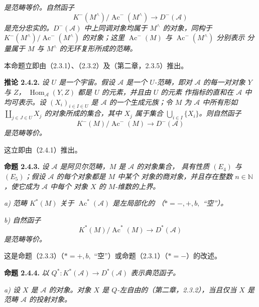 \clearpage
{}%
\begingroup\small\setlength{\parskip}{0pt}\setlength{\emergencystretch}{1.5em}
\setlength{\abovedisplayskip}{4pt plus 2pt minus 2pt}%
\setlength{\belowdisplayskip}{4pt plus 2pt minus 2pt}%

\noindent\textit{是范畴等价。自然函子}
\[
K^{-}(M^{\wedge})/\operatorname{Ac}^{-}(M^{\wedge})
\longrightarrow D^{-}(\mathcal A)
\]
\noindent\textit{是充分忠实的。$D^{-}(\mathcal A)$ 中上同调对象均属于
$M^{\wedge}$ 的对象，同构于
$K^{-}(M^{\wedge})/\operatorname{Ac}^{-}(M^{\wedge})$ 的对象；这里
$\operatorname{Ac}^{-}(M)$ 与 $\operatorname{Ac}^{-}(M^{\wedge})$ 分别表示
分量属于 $M$ 与 $M^{\wedge}$ 的无环复形所成的范畴。}

本命题立即由（2.3.1）、（2.3.2）及（第二章，2.3.5）推出。

\medskip\noindent\textbf{推论 2.4.2.}\quad
\textit{设 $U$ 是一个宇宙。假设 $\mathcal A$ 是一个 $U$-范畴，即对
$\mathcal A$ 的每一对对象 $Y$ 与 $Z$，
$\operatorname{Hom}_{\mathcal A}(Y,Z)$ 都是 $U$ 的元素，并且由 $U$ 的元素
作指标的直和在 $\mathcal A$ 中均可表示。设 $(X_i)_{i\in I\in U}$ 是
$\mathcal A$ 的一个生成元族；令 $M$ 为 $\mathcal A$ 中所有形如
$\coprod_{j\in J\in U}X_j$ 的对象所成的集合，其中 $X_j$ 属于集合
$\bigcup_{i\in I}\{X_i\}$。则自然函子}
\[
K^{-}(M)/\operatorname{Ac}^{-}(M)\longrightarrow D^{-}(\mathcal A)
\]
\noindent\textit{是范畴等价。}

这立即由（2.4.1）推出。

\medskip\noindent\textbf{命题 2.4.3.}\quad
\textit{设 $\mathcal A$ 是阿贝尔范畴，$M$ 是 $\mathcal A$ 的对象集合，
具有性质 $(E_4)$ 与 $(E_5)$；假设 $\mathcal A$ 的每个对象都是 $M$ 中某个
对象的商对象，并且存在整数 $n\in\mathbb N$，使它成为 $\mathcal A$ 中每个
对象 $X$ 的 $M$-维数的上界。}

\noindent\textit{a) 范畴 $K^{*}(M)$ 关于
$\operatorname{Ac}^{*}(\mathcal A)$ 是左局部化的
（$*=-,+,b,{}$ ``空''）。}

\noindent\textit{b) 自然函子}
\[
K^{*}(M)/\operatorname{Ac}^{*}(M)\longrightarrow D^{*}(\mathcal A)
\]
\noindent\textit{是范畴等价。}

这是命题（2.3.3）（$*=+,b,{}$ ``空''）或命题（2.3.1）（$*=-$）的改述。

\medskip\noindent\textbf{命题 2.4.4.}\quad
\textit{以
$Q^{*}\colon K^{*}(\mathcal A)\longrightarrow D^{*}(\mathcal A)$ 表示典范函子。}

\noindent\textit{a) 设 $X$ 是 $\mathcal A$ 的对象。对象 $X$ 是
$Q$-左自由的（第二章，2.3.2），当且仅当 $X$ 是范畴 $\mathcal A$ 的投射对象。}
\endgroup

